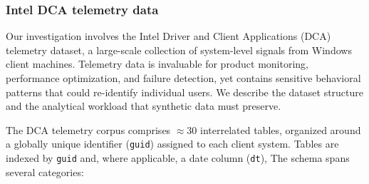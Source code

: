 \documentclass[12pt,letterpaper]{article}
\renewcommand{\_}{\textunderscore\allowbreak}
\begin{document}
\subsubsection{Intel DCA telemetry data}

Our investigation involves the Intel Driver and Client Applications (DCA) telemetry dataset, a large-scale collection of system-level signals from Windows client machines. Telemetry data is invaluable for product monitoring, performance optimization, and failure detection, yet contains sensitive behavioral patterns that could re-identify individual users. We describe the dataset structure and the analytical workload that synthetic data must preserve.

The DCA telemetry corpus comprises $\approx 30$ interrelated tables, organized around a globally unique identifier (\texttt{guid}) assigned to each client system. Tables are indexed by \texttt{guid} and, where applicable, a date column (\texttt{dt}), The schema spans several categories:
\end{document}
